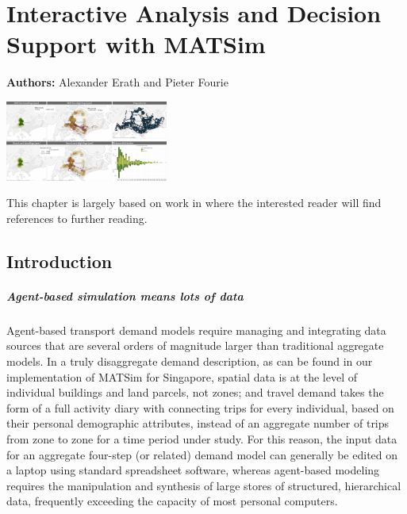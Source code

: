 \chapter{Interactive Analysis and Decision Support with MATSim}
\label{ch:businessanalytics}

\hfill \textbf{Authors:} Alexander Erath and Pieter Fourie

\begin{center} \includegraphics[width=0.4\textwidth, angle=0]{extending/figures/businessanalytics/tableau.png} \end{center}

This chapter is largely based on work in \citet[][]{ErathEtAl_EASTS_2013} where the interested reader will find references to further reading.
\section{Introduction}
\label{sec:analyticsIntro}
\paragraph{Agent-based simulation means lots of data}
Agent-based transport demand models require managing and integrating data sources that are several orders of magnitude larger than traditional aggregate models. In a truly disaggregate demand description, as can be found in our implementation of MATSim for Singapore, spatial data is at the level of individual buildings and land parcels, not zones; and travel demand takes the form of a full activity diary with connecting trips for every individual, based on their personal demographic attributes, instead of an aggregate number of trips from zone to zone for a time period under study. For this reason, the input data for an aggregate four-step (or related) demand model can generally be edited on a laptop using standard spreadsheet software, whereas agent-based modeling requires the manipulation and synthesis of large stores of structured, hierarchical data, frequently exceeding the capacity of most personal computers.

